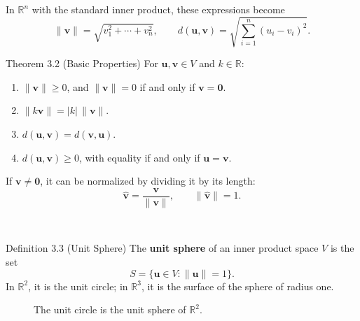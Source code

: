 \documentclass[11pt,letterpaper]{article}
\newcommand{\manualsubsection}[1]{%
  \vspace{0.2cm}\noindent{\bfseries\color{orangeacc} #1}\\[0.12cm]
}
\newcommand{\term}[1]{\textbf{\color{orangeacc}#1}}
\begin{document}
In $\mathbb{R}^n$ with the standard inner product, these expressions become
\begin{equation}
  \|\mathbf{v}\|=\sqrt{v_1^2+\cdots+v_n^2},
  \qquad
  d(\mathbf{u},\mathbf{v})
  =\sqrt{\sum_{i=1}^{n}(u_i-v_i)^2}.
\end{equation}

\begin{theorembox}{Theorem 3.2 (Basic Properties)}
For $\mathbf{u},\mathbf{v}\in V$ and $k\in\mathbb{R}$:
\begin{enumerate}
  \item $\|\mathbf{v}\|\geq0$, and $\|\mathbf{v}\|=0$ if and only if
  $\mathbf{v}=\mathbf{0}$.
  \item $\|k\mathbf{v}\|=|k|\,\|\mathbf{v}\|$.
  \item $d(\mathbf{u},\mathbf{v})=d(\mathbf{v},\mathbf{u})$.
  \item $d(\mathbf{u},\mathbf{v})\geq0$, with equality if and only if
  $\mathbf{u}=\mathbf{v}$.
\end{enumerate}
\end{theorembox}

If $\mathbf{v}\neq\mathbf{0}$, it can be normalized by dividing it by its length:
\begin{equation}
  \widehat{\mathbf{v}}=\frac{\mathbf{v}}{\|\mathbf{v}\|},
  \qquad \|\widehat{\mathbf{v}}\|=1.
\end{equation}

\manualsubsection{The Unit Sphere}

\begin{infobox}[orangeacc]{Definition 3.3 (Unit Sphere)}
The \term{unit sphere} of an inner product space $V$ is the set
\begin{equation}
  S=\{\mathbf{u}\in V:\|\mathbf{u}\|=1\}.
\end{equation}
In $\mathbb{R}^2$, it is the unit circle; in $\mathbb{R}^3$, it is the surface of the
sphere of radius one.
\end{infobox}

\begin{figure}[htbp]
\centering
{}
\caption{The unit circle is the unit sphere of $\mathbb{R}^2$.}
\label{fig:unit-circle}
\end{figure}
\FloatBarrier
\end{document}
